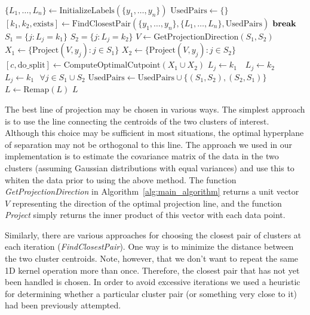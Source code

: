 \documentclass[10pt]{article}
\begin{document}
\begin{algorithm}
\caption{}
\begin{algorithmic}
\State $\{L_1,\dots,L_n\} \gets \text{InitializeLabels} (\{y_1,\dots,y_n\})$
\State $\text{UsedPairs} \gets \{\}$
\Loop
	\State $[k_1,k_2,\text{exists}] \gets \text{FindClosestPair}(\{y_1,\dots,y_n\},\{L_1,\dots,L_n\},\text{UsedPairs})$
	 
		\State $\text{\textbf{break}}$ 
	\EndIf
	\State $S_1=\{j: L_j=k_1\}$
	\State $S_2=\{j: L_j=k_2\}$
	\State $V \gets \text{GetProjectionDirection}(S_1,S_2)$
	\State $X_1 \gets \{\text{Project}(V,y_j): j\in S_1\}$
	\State $X_2 \gets \{\text{Project}(V,y_j): j\in S_2\}$
	\State $[c,\text{do\_split}] \gets \text{ComputeOptimalCutpoint}(X_1\cup X_2)$
	 
				$L_j \gets k_1$
			\Else
				$\text{ }L_j \gets k_2$
			\EndIf
		\EndFor
	\Else {}
		\State $L_j\gets k_1 \text{ }\forall j\in S_1\cup S_2$ 
	\EndIf
	\State $\text{UsedPairs}\gets\text{UsedPairs}\cup\{(S_1,S_2),(S_2,S_1)\}$
        \EndLoop
\State{}
\State $L\gets \text{Remap}(L)$
\State \Return $L$
\EndFunction
\end{algorithmic}
\label{alg:main_algorithm}
\end{algorithm}

The best line of projection may be chosen in various ways. The simplest approach is to use the line connecting the centroids of the two clusters of interest. Although this choice may be sufficient in most situations, the optimal hyperplane of separation may not be orthogonal to this line. The approach we used in our implementation is to estimate the covariance matrix of the data in the two clusters (assuming Gaussian distributions with equal variances) and use this to whiten the data prior to using the above method. The function \emph{GetProjectionDirection} in Algorithm~\ref{alg:main_algorithm} returns a unit vector $V$ representing the direction of the optimal projection line, and the function \emph{Project} simply returns the inner product of this vector with each data point.

Similarly, there are various approaches for choosing the closest pair of clusters at each iteration (\emph{FindClosestPair}). One way is to minimize the distance between the two cluster centroids. Note, however, that we don't want to repeat the same 1D kernel operation more than once. Therefore, the closest pair that has not yet been handled is chosen. In order to avoid excessive iterations we used a heuristic for determining whether a particular cluster pair (or something very close to it) had been previously attempted.
\end{document}
